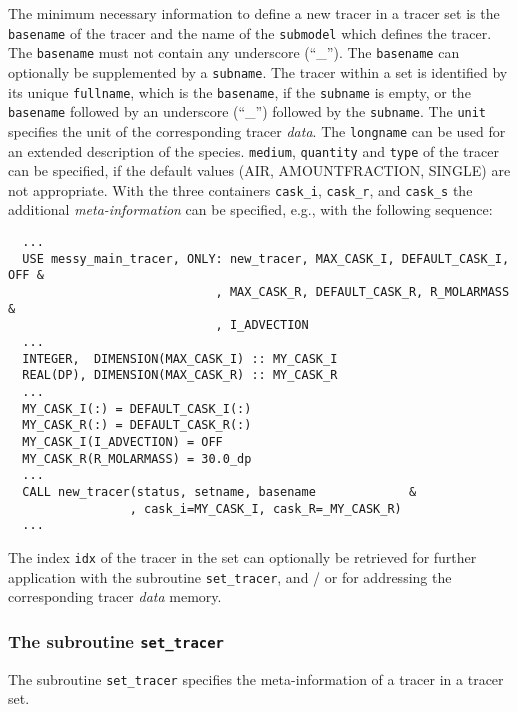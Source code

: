 \documentclass[twoside]{article}
\begin{document}
The minimum necessary information to define a new tracer in a tracer set is the
{\tt basename} of the tracer and the name of the {\tt submodel}
which defines the tracer.
%
The {\tt basename} must not contain any underscore (``\_'').
%
The {\tt basename} can optionally be supplemented by a
{\tt subname}.
%
The tracer within a set is identified by its unique {\tt fullname}, which
is the {\tt basename}, if the {\tt subname} is empty, or the
{\tt basename} followed by an underscore (``\_'') followed by the
{\tt subname}.
%
The {\tt unit} specifies the unit of the corresponding
tracer {\it data}. 
%
The {\tt longname} can be used for an extended description of the species.
%
{\tt medium}, {\tt quantity} and {\tt type} of
the tracer can be specified, if the default values
(AIR, AMOUNTFRACTION, SINGLE) are not appropriate.
%
With the three containers {\tt cask\_i}, {\tt cask\_r}, and 
{\tt cask\_s} the additional {\it meta-information} can be specified,
e.g., with the following sequence:
\begin{verbatim}
  ...
  USE messy_main_tracer, ONLY: new_tracer, MAX_CASK_I, DEFAULT_CASK_I, OFF &
                             , MAX_CASK_R, DEFAULT_CASK_R, R_MOLARMASS &
                             , I_ADVECTION
  ...
  INTEGER,  DIMENSION(MAX_CASK_I) :: MY_CASK_I
  REAL(DP), DIMENSION(MAX_CASK_R) :: MY_CASK_R
  ...
  MY_CASK_I(:) = DEFAULT_CASK_I(:)
  MY_CASK_R(:) = DEFAULT_CASK_R(:)
  MY_CASK_I(I_ADVECTION) = OFF
  MY_CASK_R(R_MOLARMASS) = 30.0_dp
  ...
  CALL new_tracer(status, setname, basename             &
                 , cask_i=MY_CASK_I, cask_R=_MY_CASK_R)
  ...
\end{verbatim}

The index {\tt idx} of the tracer in the set can optionally be
retrieved for further application with the subroutine
{\tt set\_tracer}, and / or for addressing the corresponding tracer
{\it data} memory.


\subsubsection{The subroutine {\tt set\_tracer}}
%
The subroutine {\tt set\_tracer} specifies the meta-information of a
tracer in a tracer set.
\end{document}
